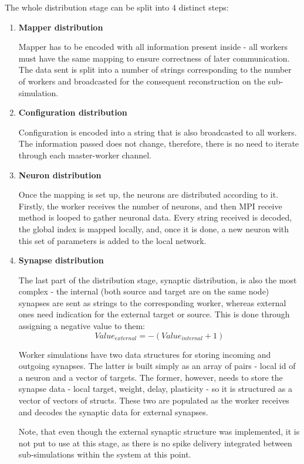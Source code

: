 The whole distribution stage can be split into 4 distinct steps:

\begin{enumerate}
\item{\textbf{Mapper distribution}}

Mapper has to be encoded with all information present inside - all workers must have the same mapping to ensure correctness of later communication. The data sent is split into a number of strings corresponding to the number of workers and broadcasted for the consequent reconstruction on the sub-simulation.

\item{\textbf{Configuration distribution}}

Configuration is encoded into a string that is also broadcasted to all workers. The information passed does not change, therefore, there is no need to iterate through each master-worker channel.

\item{\textbf{Neuron distribution}}

Once the mapping is set up, the neurons are distributed according to it. Firstly, the worker receives the number of neurons, and then MPI receive method is looped to gather neuronal data. Every string received is decoded, the global index is mapped locally, and, once it is done, a new neuron with this set of parameters is added to the local network.

\item{\textbf{Synapse distribution}}

The last part of the distribution stage, synaptic distribution, is also the most complex - the internal (both source and target are on the same node) synapses are sent as strings to the corresponding worker, whereas external ones need indication for the external target or source. This is done through assigning a negative value to them:
\begin{equation}Value_{external} = -(Value_{internal}+1)\end{equation}

Worker simulations have two data structures for storing incoming and outgoing synapses. The latter is built simply as an array of pairs - local id of a neuron and a vector of targets. The former, however, needs to store the synapse data - local target, weight, delay, plasticity - so it is structured as a vector of vectors of structs. These two are populated as the worker receives and decodes the synaptic data for external synapses.

Note, that even though the external synaptic structure was implemented, it is not put to use at this stage, as there is no spike delivery integrated between sub-simulations within the system at this point.
\end{enumerate}

